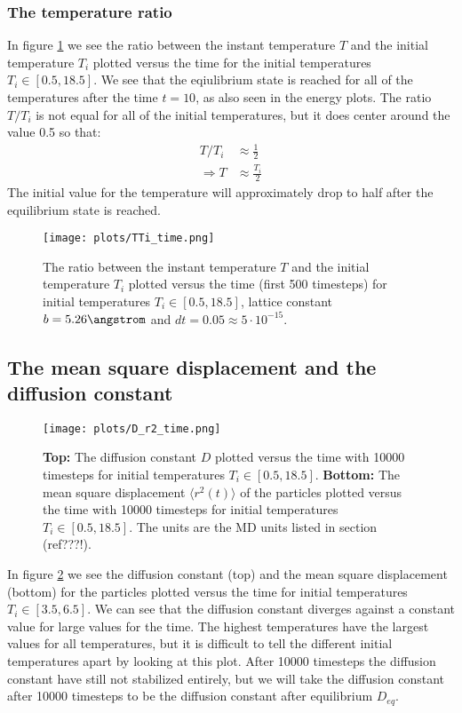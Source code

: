 \documentclass[11pt,a4wide]{article}
\begin{document}
\subsubsection*{The temperature ratio}
In figure \ref{fig: TTi_time} we see the ratio between the instant temperature $T$ and the initial temperature $T_i$ plotted versus the time for the initial temperatures $T_i \in [0.5, 18.5]$. We see that the eqiulibrium state is reached for all of the temperatures after the time $t=10$, as also seen in the energy plots. The ratio $T/T_i$ is not equal for all of the initial temperatures, but it does center around the value 0.5 so that:
\begin{align}
T/T_i &\approx \frac{1}{2} \nonumber \\ 
\Rightarrow T &\approx \frac{T_i }{2} 
\label{eq: T_ratio}
\end{align}
The initial value for the temperature will approximately drop to half after the equilibrium state is reached. 

\begin{figure}[htp]
\centering
\texttt{[image: plots/TTi\_time.png]}
\caption{The ratio between the instant temperature $T$ and the initial temperature $T_i$ plotted versus the time (first 500 timesteps) for initial temperatures $T_i \in [0.5, 18.5]$, lattice constant $b=5.26 \angstrom$ and $dt=0.05\approx  5\cdot 10^{-15}$.}
\label{fig: TTi_time}
\end{figure}

\subsection{The mean square displacement and the diffusion constant}

\begin{figure}[htp]
\centering
\texttt{[image: plots/D\_r2\_time.png]}
\caption{\textbf{Top:} The diffusion constant $D$ plotted versus the time with 10000 timesteps for initial temperatures $T_i \in [0.5, 18.5]$. \textbf{Bottom:} The mean square displacement $\langle r^2(t) \rangle$ of the particles plotted versus the time with 10000 timesteps for initial temperatures $T_i \in [0.5, 18.5]$. The units are the MD units listed in section (ref???!).}
\label{fig: D_r2_time}
\end{figure}

In figure \ref{fig: D_r2_time} we see the diffusion constant (top) and the mean square displacement (bottom) for the particles plotted versus the time for initial temperatures $T_i \in [3.5, 6.5]$. We can see that the diffusion constant diverges against a constant value for large values for the time. The highest temperatures have the largest values for all temperatures, but it is difficult to tell the different initial temperatures apart by looking at this plot. After 10000 timesteps the diffusion constant have still not stabilized entirely, but we will take the diffusion constant after 10000 timesteps to be the diffusion constant after equilibrium $D_{eq}$. 
\end{document}
